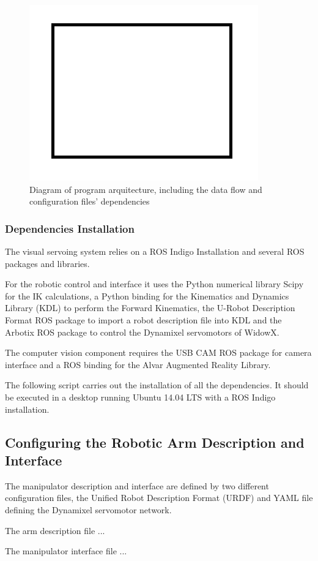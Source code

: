 \documentclass[11pt]{article}
\begin{document}
    \begin{figure}[h]
    \centering
    \includegraphics[width=0.35\linewidth]{img/sample}
    \caption{Diagram of program arquitecture, including the data flow and configuration files' dependencies}
    \label{fig:setup}
    \end{figure}
    
    \subsubsection{Dependencies Installation}
        The visual servoing system relies on a ROS Indigo Installation and several ROS packages and libraries. 
        
        For the robotic control and interface it uses the Python numerical library Scipy for the IK calculations, a Python binding for the Kinematics and Dynamics Library (KDL) to perform the Forward Kinematics, the U-Robot Description Format ROS package to import a robot description file into KDL and the Arbotix ROS package to control the Dynamixel servomotors of WidowX.
        
        The computer vision component requires the USB CAM ROS package for camera interface and a ROS binding for the Alvar Augmented Reality Library.
        
        \noindent The following script carries out the installation of all the dependencies. It should be executed in a desktop running Ubuntu 14.04 LTS with a ROS Indigo installation.
        

    \subsection{Configuring the Robotic Arm Description and Interface}
        The manipulator description and interface are defined by two different configuration files, the Unified Robot Description Format (URDF) and YAML file defining the Dynamixel servomotor network.
        
        The arm description file ...
        
        The manipulator interface file ...
    
\end{document}
